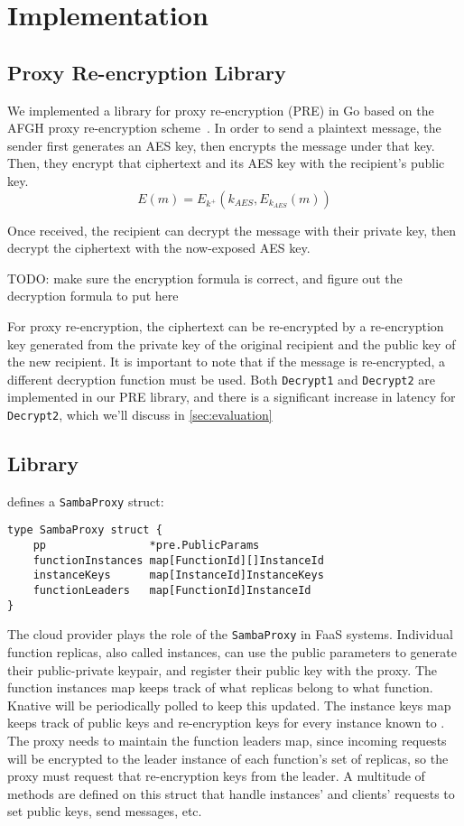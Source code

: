 \section{Implementation}
\label{sec:implementation}

\subsection{Proxy Re-encryption Library}
\label{sec:PRE}
%
We implemented a library for proxy re-encryption (PRE) in Go based on the AFGH proxy re-encryption scheme~\cite{05-ndss-improved_proxy_reencryption}.
In order to send a plaintext message, the sender first generates an AES key, then encrypts the message under that key.
Then, they encrypt that ciphertext and its AES key with the recipient's public key.
$$E(m) = E_{k^+}(k_{AES},E_{k_{AES}}(m))$$

Once received, the recipient can decrypt the message with their private key, then decrypt the ciphertext with the now-exposed AES key.

\color{red}TODO: make sure the encryption formula is correct,
and figure out the decryption formula to put here\color{black}
%

%
For proxy re-encryption, the ciphertext can be re-encrypted by a re-encryption key generated from the private key of the original recipient and the public key of the new recipient.
%
It is important to note that if the message is re-encrypted, a different decryption function must be used.
%
Both \texttt{Decrypt1} and \texttt{Decrypt2} are implemented in our PRE library, and there is a significant increase in latency for \texttt{Decrypt2}, which we'll discuss in \ref{sec:evaluation}


\subsection{\SystemName Library}
%
\SystemName defines a \texttt{SambaProxy} struct:

\begin{verbatim}
type SambaProxy struct {
	pp                *pre.PublicParams
	functionInstances map[FunctionId][]InstanceId
	instanceKeys      map[InstanceId]InstanceKeys
	functionLeaders   map[FunctionId]InstanceId
}
\end{verbatim}

The cloud provider plays the role of the \texttt{SambaProxy} in FaaS systems.
%
Individual function replicas, also called instances, can use the public parameters to generate their public-private keypair, and register their public key with the proxy.
%
The function instances map keeps track of what replicas belong to what function. Knative will be periodically polled to keep this updated.
%
The instance keys map keeps track of public keys and re-encryption keys for every instance known to \SystemName.
%
The proxy needs to maintain the function leaders map, since incoming requests will be encrypted to the leader instance of each function's set of replicas, so the proxy must request that re-encryption keys from the leader.
%
A multitude of methods are defined on this struct that handle instances' and clients' requests to set public keys, send messages, etc.


